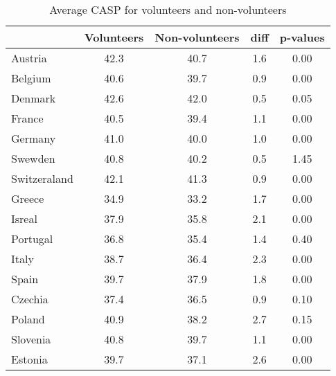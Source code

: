 \begin{table}[H]
\caption{\label{clabel} Average CASP for volunteers and non-volunteers}\centering\medskip
\begin{tabular}{lcccc} \hline \hline
 & Volunteers  & Non-volunteers  & diff  & p-values  \\  \hline 
Austria &      42.3 &      40.7 &       1.6 &      0.00 \\  
Belgium &      40.6 &      39.7 &       0.9 &      0.00 \\  
Denmark &      42.6 &      42.0 &       0.5 &      0.05 \\  
France &      40.5 &      39.4 &       1.1 &      0.00 \\  
Germany &      41.0 &      40.0 &       1.0 &      0.00 \\  
Swewden &      40.8 &      40.2 &       0.5 &      1.45 \\  
Switzeraland &      42.1 &      41.3 &       0.9 &      0.00 \\  
Greece &      34.9 &      33.2 &       1.7 &      0.00 \\  
Isreal &      37.9 &      35.8 &       2.1 &      0.00 \\  
Portugal &      36.8 &      35.4 &       1.4 &      0.40 \\  
Italy &      38.7 &      36.4 &       2.3 &      0.00 \\  
Spain &      39.7 &      37.9 &       1.8 &      0.00 \\  
Czechia &      37.4 &      36.5 &       0.9 &      0.10 \\  
Poland &      40.9 &      38.2 &       2.7 &      0.15 \\  
Slovenia &      40.8 &      39.7 &       1.1 &      0.00 \\  
Estonia &      39.7 &      37.1 &       2.6 &      0.00 \\  
\hline \hline \end{tabular}
\end{table}
